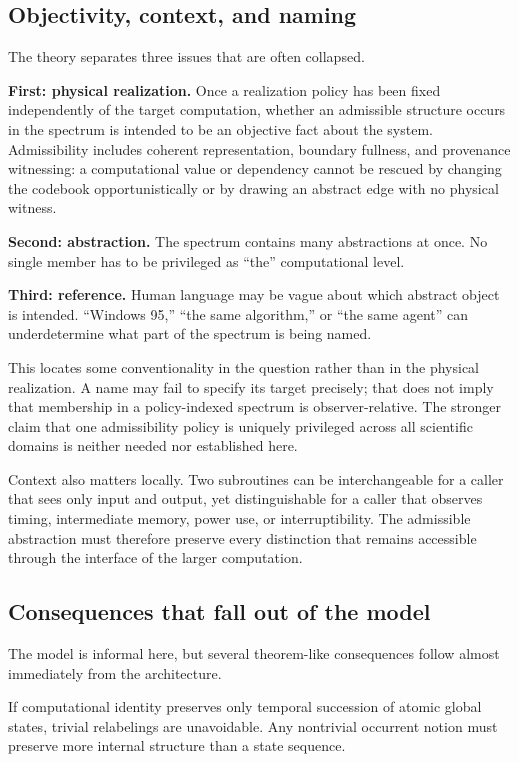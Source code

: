 \documentclass[11pt,a4paper]{article}
\begin{document}
\subsection{Objectivity, context, and naming}

The theory separates three issues that are often collapsed.

\textbf{First: physical realization.} Once a realization policy has been fixed independently of the target computation, whether an admissible structure occurs in the spectrum is intended to be an objective fact about the system. Admissibility includes coherent representation, boundary fullness, and provenance witnessing: a computational value or dependency cannot be rescued by changing the codebook opportunistically or by drawing an abstract edge with no physical witness.

\textbf{Second: abstraction.} The spectrum contains many abstractions at once. No single member has to be privileged as ``the'' computational level.

\textbf{Third: reference.} Human language may be vague about which abstract object is intended. ``Windows 95,'' ``the same algorithm,'' or ``the same agent'' can underdetermine what part of the spectrum is being named.

This locates some conventionality in the question rather than in the physical realization. A name may fail to specify its target precisely; that does not imply that membership in a policy-indexed spectrum is observer-relative. The stronger claim that one admissibility policy is uniquely privileged across all scientific domains is neither needed nor established here.

Context also matters locally. Two subroutines can be interchangeable for a caller that sees only input and output, yet distinguishable for a caller that observes timing, intermediate memory, power use, or interruptibility. The admissible abstraction must therefore preserve every distinction that remains accessible through the interface of the larger computation.

\subsection{Consequences that fall out of the model}

The model is informal here, but several theorem-like consequences follow almost immediately from the architecture.

\begin{consequencebox}[title={1. Bare trajectory identity is too weak}]
If computational identity preserves only temporal succession of atomic global states, trivial relabelings are unavoidable. Any nontrivial occurrent notion must preserve more internal structure than a state sequence.
\end{consequencebox}
\end{document}
